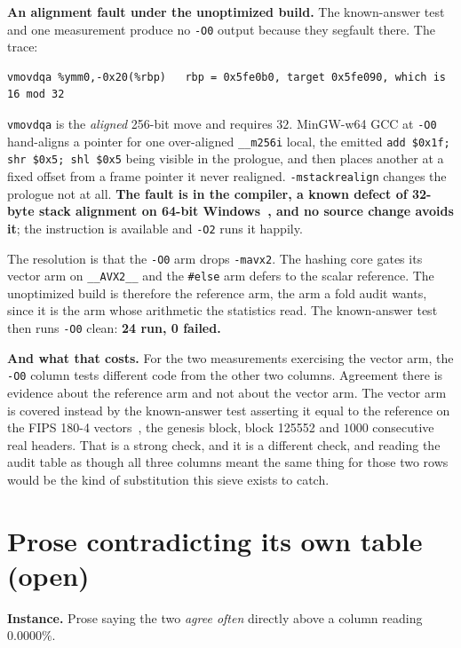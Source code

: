 \textbf{An alignment fault under the unoptimized build.} The known-answer test and one measurement produce no \texttt{-O0} output because they segfault there. The trace:

\begin{verbatim}
vmovdqa %ymm0,-0x20(%rbp)   rbp = 0x5fe0b0, target 0x5fe090, which is 16 mod 32
\end{verbatim}

\texttt{vmovdqa} is the \emph{aligned} 256-bit move and requires \(32\). MinGW-w64 GCC at \texttt{-O0} hand-aligns a pointer for one over-aligned \texttt{\_\_m256i} local, the emitted \texttt{add \$0x1f; shr \$0x5; shl \$0x5} being visible in the prologue, and then places another at a fixed offset from a frame pointer it never realigned. \texttt{-mstackrealign} changes the prologue not at all. \textbf{The fault is in the compiler, a known defect of 32-byte stack alignment on 64-bit Windows~\cite{src:GCC-bug-54412}, and no source change avoids it}; the instruction is available and \texttt{-O2} runs it happily.

The resolution is that the \texttt{-O0} arm drops \texttt{-mavx2}. The hashing core gates its vector arm on \texttt{\_\_AVX2\_\_} and the \texttt{\#else} arm defers to the scalar reference. The unoptimized build is therefore the reference arm, the arm a fold audit wants, since it is the arm whose arithmetic the statistics read. The known-answer test then runs \texttt{-O0} clean: \textbf{24 run, 0 failed.}

\textbf{And what that costs.} For the two measurements exercising the vector arm, the \texttt{-O0} column tests different code from the other two columns. Agreement there is evidence about the reference arm and not about the vector arm. The vector arm is covered instead by the known-answer test asserting it equal to the reference on the FIPS 180-4 vectors~\cite{src:FIPS-180-4}, the genesis block, block 125552 and \(1000\) consecutive real headers. That is a strong check, and it is a different check, and reading the audit table as though all three columns meant the same thing for those two rows would be the kind of substitution this sieve exists to catch.

\section{Prose contradicting its own table (open)}

\textbf{Instance.} Prose saying the two \emph{agree often} directly above a column reading \(0.0000\%\).

